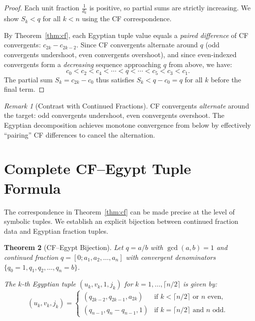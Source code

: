 \documentclass[11pt]{article}
\newtheorem{theorem}{Theorem}
\theoremstyle{definition}
\theoremstyle{remark}
\newtheorem{remark}[theorem]{Remark}
\begin{document}
\begin{proof}
Each unit fraction $\frac{1}{d_k}$ is positive, so partial sums are strictly
increasing. We show $S_k < q$ for all $k < n$ using the CF correspondence.

By Theorem~\ref{thm:cf}, each Egyptian tuple value equals a \emph{paired difference}
of CF convergents: $c_{2k} - c_{2k-2}$. Since CF convergents alternate around $q$
(odd convergents undershoot, even convergents overshoot), and since even-indexed
convergents form a \emph{decreasing} sequence approaching $q$ from above, we have:
\[
c_0 < c_2 < c_4 < \cdots < q < \cdots < c_5 < c_3 < c_1.
\]
The partial sum $S_k = c_{2k} - c_0$ thus satisfies $S_k < q - c_0 = q$ for all $k$
before the final term.
\end{proof}

\begin{remark}[Contrast with Continued Fractions]
CF convergents \emph{alternate} around the target: odd convergents undershoot,
even convergents overshoot. The Egyptian decomposition achieves monotone convergence
from below by effectively ``pairing'' CF differences to cancel the alternation.
\end{remark}

\section{Complete CF--Egypt Tuple Formula}

The correspondence in Theorem~\ref{thm:cf} can be made precise at the level of
symbolic tuples. We establish an explicit bijection between continued fraction
data and Egyptian fraction tuples.

\begin{theorem}[CF--Egypt Bijection]\label{thm:bijection}
Let $q = a/b$ with $\gcd(a,b) = 1$ and continued fraction
$q = [0; a_1, a_2, \ldots, a_n]$ with convergent denominators
$\{q_0 = 1, q_1, q_2, \ldots, q_n = b\}$.

The $k$-th Egyptian tuple $(u_k, v_k, 1, j_k)$ for $k = 1, \ldots, \lceil n/2 \rceil$
is given by:
\begin{equation}
(u_k, v_k, j_k) = \begin{cases}
(q_{2k-2}, q_{2k-1}, a_{2k}) & \text{if } k < \lceil n/2 \rceil \text{ or } n \text{ even}, \\
(q_{n-1}, q_n - q_{n-1}, 1) & \text{if } k = \lceil n/2 \rceil \text{ and } n \text{ odd}.
\end{cases}
\end{equation}
\end{theorem}
\end{document}

